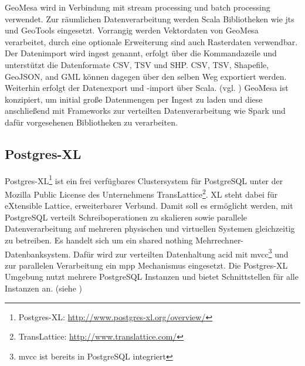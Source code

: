 GeoMesa wird in Verbindung mit stream processing und batch processing verwendet.
Zur räumlichen Datenverarbeitung werden Scala Bibliotheken wie \Gls{jts} und GeoTools eingesetzt.
Vorrangig werden Vektordaten von GeoMesa verarbeitet, durch eine optionale Erweiterung sind auch Rasterdaten verwendbar.
Der Datenimport wird ingest genannt, erfolgt über die Kommandazeile und unterstützt die Datenformate CSV, TSV und SHP.
CSV, TSV, Shapefile, GeoJSON, and GML können dagegen über den selben Weg exportiert werden.
Weiterhin erfolgt der Datenexport und -import über Scala. (vgl. \cite{website:geomesa-ingest})
GeoMesa ist konzipiert, um initial große Datenmengen per Ingest zu laden und diese anschließend mit Frameworks zur verteilten Datenverarbeitung wie Spark und dafür vorgesehenen Bibliotheken zu verarbeiten.

\subsection{Postgres-XL}
\label{grundlagen:postgresxl}
Postgres-XL\footnote{Postgres-XL: \url{http://www.postgres-xl.org/overview/}} ist ein frei verfügbares Clustersystem für PostgreSQL unter der Mozilla Public License des Unternehmens TransLattice\footnote{TransLattice: \url{http://www.translattice.com/}}.
XL steht dabei für eXtensible Lattice, erweiterbarer Verbund.
Damit soll es ermöglicht werden, mit PostgreSQL verteilt Schreiboperationen zu skalieren sowie parallele Datenverarbeitung auf mehreren physischen und virtuellen Systemen gleichzeitig zu betreiben.
Es handelt sich um ein shared nothing Mehrrechner-Datenbanksystem.
Dafür wird zur verteilten Datenhaltung \Gls{acid} mit \Gls{mvcc}\footnote{\Gls{mvcc} ist bereits in PostgreSQL integriert} und zur parallelen Verarbeitung ein \Gls{mpp} Mechanismus eingesetzt.
Die Postgres-XL Umgebung nutzt mehrere PostgreSQL Instanzen und bietet Schnittstellen für alle Instanzen an. (siehe \cite{website:postgresxl-about})

